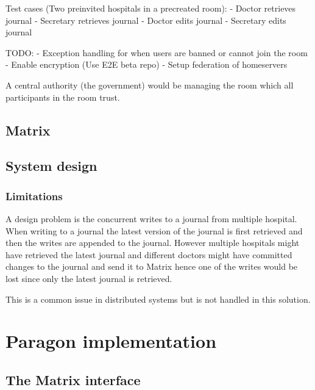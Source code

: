 Test cases (Two preinvited hospitals in a precreated room):
- Doctor retrieves journal
- Secretary retrieves journal
- Doctor edits journal 
- Secretary edits journal

TODO:
- Exception handling for when users are banned or cannot join the room
- Enable encryption (Use E2E beta repo)
- Setup federation of homeservers



A central authority (the government) would be managing the room which all participants in the room trust. 



\subsection{Matrix}



\subsection{System design}


\subsubsection{Limitations}

A design problem is the concurrent writes to a journal from multiple hospital. When writing to a journal the latest version of the journal is first retrieved and then the writes are appended to the journal. However multiple hospitals might have retrieved the latest journal and different doctors might have committed changes to the journal and send it to Matrix hence one of the writes would be lost since only the latest journal is retrieved.

This is a common issue in distributed systems but is not handled in this solution.




\section{Paragon implementation}

\subsection{The Matrix interface}

